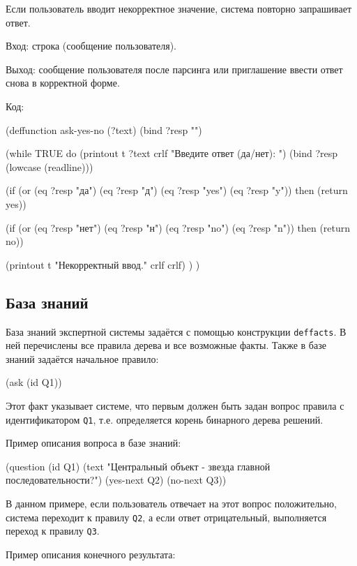 \documentclass[14pt,a4paper]{extarticle}
\begin{document}
Если пользователь вводит некорректное значение, система повторно запрашивает ответ.

Вход: строка (сообщение пользователя).

Выход: сообщение пользователя после парсинга или приглашение ввести ответ снова в корректной форме.

Код:

\begin{Code}
(deffunction ask-yes-no (?text)
  (bind ?resp "")

  (while TRUE do
    (printout t ?text crlf "Введите ответ (да/нет): ")
    (bind ?resp (lowcase (readline)))

    (if (or (eq ?resp "да") (eq ?resp "д") 
            (eq ?resp "yes") (eq ?resp "y"))
      then
      (return yes))

    (if (or (eq ?resp "нет") (eq ?resp "н") 
            (eq ?resp "no") (eq ?resp "n"))
      then
      (return no))

    (printout t "Некорректный ввод." crlf crlf)
  )
)
\end{Code}

\subsection{База знаний}

База знаний экспертной системы задаётся с помощью конструкции \texttt{deffacts}. В ней перечислены все правила дерева и все возможные факты. Также в базе знаний задаётся начальное правило:

\begin{Code}
(ask (id Q1))
\end{Code}

Этот факт указывает системе, что первым должен быть задан вопрос правила с идентификатором \texttt{Q1}, т.е. определяется корень бинарного дерева решений.

Пример описания вопроса в базе знаний:

\begin{Code}
(question
  (id Q1)
  (text "Центральный объект - звезда главной последовательности?")
  (yes-next Q2)
  (no-next Q3))
\end{Code}

В данном примере, если пользователь отвечает на этот вопрос положительно, система переходит к правилу \texttt{Q2}, а если ответ отрицательный, выполняется переход к правилу \texttt{Q3}.

Пример описания конечного результата:
\end{document}
